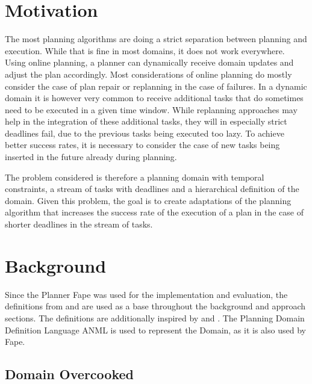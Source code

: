 \section{Motivation}

The most planning algorithms are doing a strict separation between planning and execution.
While that is fine in most domains, it does not work everywhere.
Using online planning, a planner can dynamically receive domain updates and adjust the plan accordingly.
Most considerations of online planning do mostly consider the case of plan repair or replanning in the case of failures.
In a dynamic domain it is however very common to receive additional tasks that do sometimes need to be executed in a given time window.
While replanning approaches may help in the integration of these additional tasks, they will in especially strict deadlines fail, due to the previous tasks being executed too lazy.
To achieve better success rates, it is necessary to consider the case of new tasks being inserted in the future already during planning.

The problem considered is therefore a planning domain with temporal constraints, a stream of tasks with deadlines and a hierarchical definition of the domain.
Given this problem, the goal is to create adaptations of the planning algorithm that increases the success rate of the execution of a plan in the case of shorter deadlines in the stream of tasks.


\section{Background}\label{sec:background}

Since the Planner Fape \citep{bit-monnotFAPEConstraintbasedPlanner2020} was used for the implementation and evaluation, the definitions from \cite{bit-monnotTemporalHierarchicalModels2017} and \cite{bit-monnotFAPEConstraintbasedPlanner2020} are used as a base throughout the background and approach sections.
The definitions are additionally inspired by \cite{ghallabAutomatedPlanningTheory2004} and \cite{hollerGuidingSearchHTN2019}.
The Planning Domain Definition Language ANML is used to represent the Domain, as it is also used by Fape.

\subsection{Domain Overcooked}

